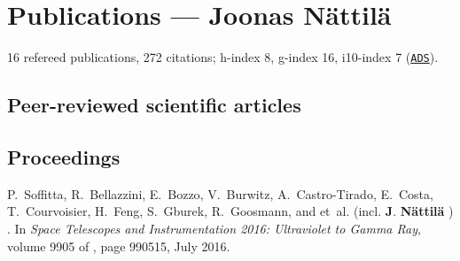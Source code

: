 \documentclass[10pt]{article}
\newcommand\VRule{\color{lightgray}\vrule width 0.5pt}
\begin{document}


\newpage

\section*{Publications --- Joonas N\"attil\"a}
16 refereed publications, 272 citations; h-index 8, g-index 16, i10-index 7 (\href{http://adsabs.harvard.edu/cgi-bin/abs_connect?author=nattila,+J.&aut_syn=YES&return_req=no_params}{\nolinkurl{ADS}}).

\subsection*{\phantom{sub} Peer-reviewed scientific articles}

\vspace{-20pt}
\renewcommand\refname{\phantom{bla}}



\nocite{*}


\subsection*{\phantom{sub} Proceedings}
\vspace{-20pt}
\begin{thebibliography}{1}
\vspace{-5pt}

P.~{Soffitta}, R.~{Bellazzini}, E.~{Bozzo}, V.~{Burwitz}, A.~{Castro-Tirado},
  E.~{Costa}, T.~{Courvoisier}, H.~{Feng}, S.~{Gburek}, R.~{Goosmann}, and
  et~al. (incl. \textbf{J}. \textbf{{N{\"a}ttil{\"a}}} )
.
\newblock In {\em Space Telescopes and Instrumentation 2016: Ultraviolet to
  Gamma Ray}, volume 9905 of {\em \procspie}, page 990515, July 2016.


\end{thebibliography}
\end{document}
